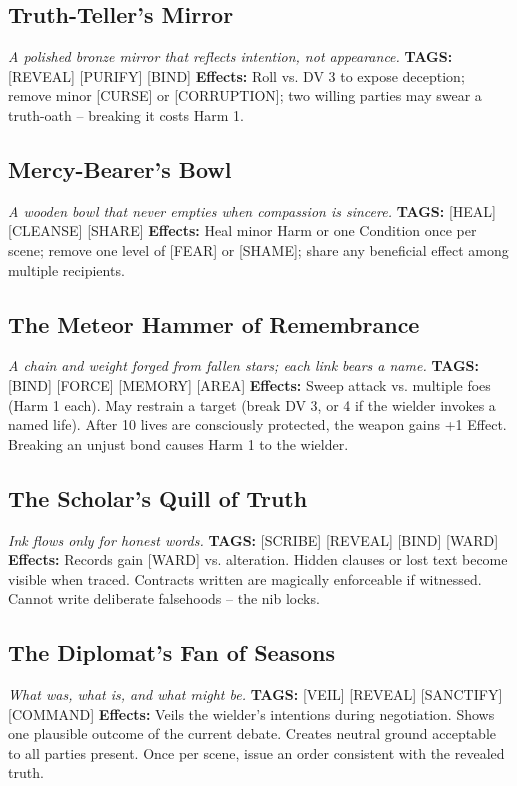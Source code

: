 \documentclass[12pt,oneside]{book}
\begin{document}
\subsection*{Truth-Teller's Mirror}
\textit{A polished bronze mirror that reflects intention, not appearance.}  
\textbf{TAGS:} [REVEAL] [PURIFY] [BIND]  
\textbf{Effects:} Roll vs. DV 3 to expose deception; remove minor [CURSE] or [CORRUPTION]; two willing parties may swear a truth-oath -- breaking it costs Harm 1.

\subsection*{Mercy-Bearer's Bowl}
\textit{A wooden bowl that never empties when compassion is sincere.}  
\textbf{TAGS:} [HEAL] [CLEANSE] [SHARE]  
\textbf{Effects:} Heal minor Harm or one Condition once per scene; remove one level of [FEAR] or [SHAME]; share any beneficial effect among multiple recipients.

\subsection*{The Meteor Hammer of Remembrance}
\textit{A chain and weight forged from fallen stars; each link bears a name.}  
\textbf{TAGS:} [BIND] [FORCE] [MEMORY] [AREA]  
\textbf{Effects:} Sweep attack vs. multiple foes (Harm 1 each). May restrain a target (break DV 3, or 4 if the wielder invokes a named life). After 10 lives are consciously protected, the weapon gains +1 Effect. Breaking an unjust bond causes Harm 1 to the wielder.

\subsection*{The Scholar's Quill of Truth}
\textit{Ink flows only for honest words.}  
\textbf{TAGS:} [SCRIBE] [REVEAL] [BIND] [WARD]  
\textbf{Effects:} Records gain [WARD] vs. alteration. Hidden clauses or lost text become visible when traced. Contracts written are magically enforceable if witnessed. Cannot write deliberate falsehoods -- the nib locks.

\subsection*{The Diplomat's Fan of Seasons}
\textit{What was, what is, and what might be.}  
\textbf{TAGS:} [VEIL] [REVEAL] [SANCTIFY] [COMMAND]  
\textbf{Effects:} Veils the wielder's intentions during negotiation. Shows one plausible outcome of the current debate. Creates neutral ground acceptable to all parties present. Once per scene, issue an order consistent with the revealed truth.
\end{document}
